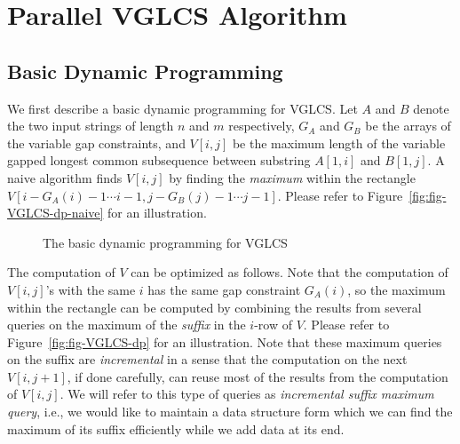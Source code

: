 \section{Parallel VGLCS Algorithm} \label{sec:parallelVGLCS}

\subsection{Basic Dynamic Programming}

We first describe a basic dynamic programming for VGLCS.  Let $A$ and
$B$ denote the two input strings of length $n$ and $m$ respectively,
$G_A$ and $G_B$ be the arrays of the variable gap constraints, and
$V[i, j]$ be the maximum length of the variable gapped longest common
subsequence between substring $A[1, i]$ and $B[1, j]$.  A naive
algorithm finds $V[i, j]$ by finding the {\em maximum} within the
rectangle $V[i-G_A(i)-1 \cdots i-1, j-G_B(j)-1 \cdots j-1]$.  Please
refer to Figure~\ref{fig:fig-VGLCS-dp-naive} for an illustration.

\begin{figure}[!thb]
  \centering {} 
  \caption{The basic dynamic programming for VGLCS}
  \label{fig:basic-dp-VGLCS}
\end{figure}

The computation of $V$ can be optimized as follows.  Note that the
computation of $V[i, j]$'s with the same $i$ has the same gap
constraint $G_A(i)$, so the maximum within the rectangle can be
computed by combining the results from several queries on the maximum
of the {\em suffix} in the $i$-row of $V$.  Please refer to
Figure~\ref{fig:fig-VGLCS-dp} for an illustration.  Note that these
maximum queries on the suffix are {\em incremental} in a sense that
the computation on the next $V[i, j + 1]$, if done carefully, can
reuse most of the results from the computation of $V[i, j]$.  We will
refer to this type of queries as {\em incremental suffix maximum
  query}, i.e., we would like to maintain a data structure form which
we can find the maximum of its suffix efficiently while we add data at
its end.


